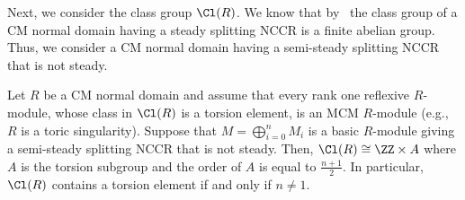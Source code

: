 
Next, we consider the class group $\Cl(R)$. We know that by~\cite[Proposition~2.8]{IN} the class group of a CM normal domain having a steady splitting NCCR is a finite abelian group. Thus, we consider a CM normal domain having a semi-steady splitting NCCR that is not steady.

\begin{theo}\label{class_semi_steady}
Let $R$ be a CM normal domain and assume that every rank one reflexive $R$-module, whose class in $\Cl(R)$ is a torsion element, is an MCM $R$-module (e.g., $R$ is a toric singularity). Suppose that $M=\bigoplus_{i=0}^nM_i$ is a basic $R$-module giving a semi-steady splitting NCCR that is not steady. Then, $\Cl(R)\cong\ZZ\times A$ where $A$ is the torsion subgroup and the order of $A$ is equal to $\frac{n+1}{2}$. In particular, $\Cl(R)$ contains a torsion element if and only if $n\neq 1$.
\end{theo}

